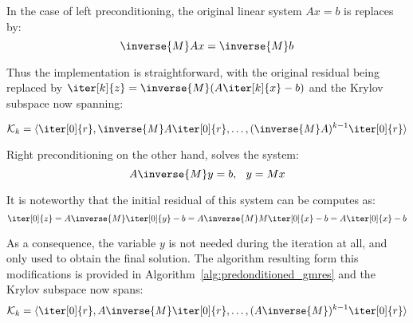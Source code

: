 \noindent In the case of left preconditioning, the original linear system $Ax=b$ is replaces by:
\begin{equation}
    \inverse{M}Ax=\inverse{M}b
\end{equation}

\noindent Thus the implementation is straightforward, with the original residual being replaced by $\iter[k]{z}=\inverse{M}(A\iter[k]{x}-b)$ and the Krylov subspace now spanning:

\begin{equation}
    \mathcal{K}_k = \langle \iter[0]{r}, \inverse{M}A\iter[0]{r}, \dots, (\inverse{M}A)^{k-1}\iter[0]{r} \rangle
\end{equation}

\noindent Right preconditioning on the other hand, solves the system:
\begin{equation}
    A\inverse{M}y=b\text{, } \;\; y=Mx
\end{equation}

\noindent It is noteworthy that the initial residual of this system can be computes as:
\begin{equation}
    \iter[0]{z} = A\inverse{M}\iter[0]{y}-b = A\inverse{M}M\iter[0]{x}-b= A\iter[0]{x}-b
\end{equation}

\noindent As a consequence, the variable $y$ is not needed during the iteration at all, and only used to obtain the final solution. The algorithm resulting form this modifications is provided in Algorithm~\hyperref[alg:predonditioned_gmres]{\ref{alg:predonditioned_gmres}} and the Krylov subspace now spans:
\begin{equation}
    \mathcal{K}_k = \langle \iter[0]{r}, A\inverse{M}\iter[0]{r}, \dots, (A\inverse{M})^{k-1}\iter[0]{r} \rangle
\end{equation}

